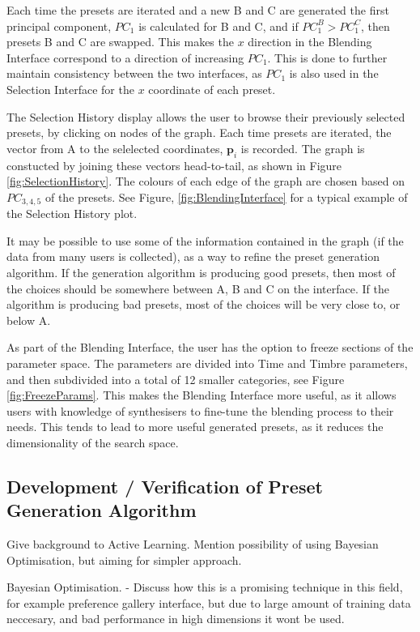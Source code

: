 \documentclass[11pt, oneside]{report}   	%
\renewcommand{\vec}[1]{\mathbf{#1}}
\begin{document}
Each time the presets are iterated and a new B and C are generated the first principal component, $PC_{1}$ is calculated for B and C, and if $PC_{1}^B > PC_{1}^C $, then presets B and C are swapped. This makes the $x$ direction in the Blending Interface correspond to a direction of increasing $PC_{1}$. This is done to further maintain consistency between the two interfaces, as $PC_{1}$ is also used in the Selection Interface for the $x$ coordinate of each preset.

The Selection History display allows the user to browse their previously selected presets, by clicking on nodes of the graph. Each time presets are iterated, the vector from A to the selelected coordinates, $\vec{p}_i$ is recorded. The graph is constucted by joining these vectors head-to-tail, as shown in Figure \ref{fig:SelectionHistory}. The colours of each edge of the graph are chosen based on $PC_{3,4,5}$ of the presets. See Figure, \ref{fig:BlendingInterface} for a typical example of the Selection History plot.

It may be possible to use some of the information contained in the graph (if the data from many users is collected), as a way to refine the preset generation algorithm. If the generation algorithm is producing good presets, then most of the choices should be somewhere between A, B and C on the interface. If the algorithm is producing bad presets, most of the choices will be very close to, or below A.

As part of the Blending Interface, the user has the option to freeze sections of the parameter space. The parameters are divided into Time and Timbre parameters, and then subdivided into a total of 12 smaller categories, see Figure \ref{fig:FreezeParams}. This makes the Blending Interface more useful, as it allows users with knowledge of synthesisers to fine-tune the blending process to their needs. This tends to lead to more useful generated presets, as it reduces the dimensionality of the search space.

\subsection{Development / Verification of Preset Generation Algorithm} \label{sec:PresetGeneration}
Give background to Active Learning. Mention possibility of using Bayesian Optimisation, but aiming for simpler approach. 

Bayesian Optimisation.  - 
Discuss how this is a promising technique in this field, for example preference gallery interface, but due to large amount of training data neccesary, and bad performance in high dimensions it wont be used.
\end{document}
